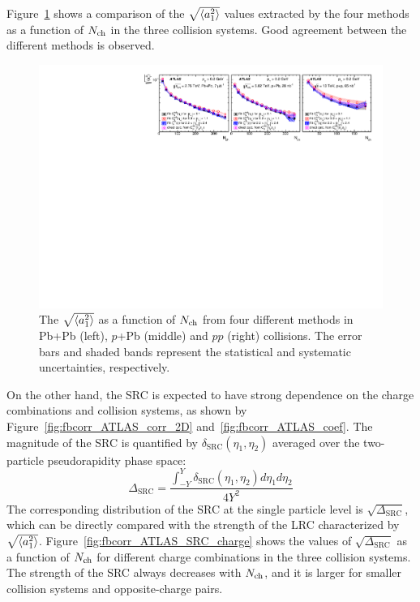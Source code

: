 Figure~\ref{fig:fbcorr_ATLAS_a1_methodComp} shows a comparison of the $\sqrt{\left\langle a_1^2\right\rangle}$ values extracted by the four methods as a function of $N_\text{ch}$ in the three collision systems. Good agreement between the different methods is observed.

\begin{figure}[H]
\centering
\includegraphics[width=.95\linewidth]{figs/chapter_fbcorr/ATLAS_a1_methodComp.pdf}
\caption{The $\sqrt{\left\langle a_1^2\right\rangle}$ as a function of $N_\text{ch}$ from four different methods in Pb+Pb (left), $p$+Pb (middle) and $pp$ (right) collisions. The error bars and shaded bands represent the statistical and systematic uncertainties, respectively.}
\label{fig:fbcorr_ATLAS_a1_methodComp}
\end{figure}

On the other hand, the SRC is expected to have strong dependence on the charge combinations and collision systems, as shown by Figure~\ref{fig:fbcorr_ATLAS_corr_2D} and~\ref{fig:fbcorr_ATLAS_coef}. The magnitude of the SRC is quantified by $\delta_\text{SRC}(\eta_1, \eta_2)$ averaged over the two-particle pseudorapidity phase space:
\begin{equation}
\Delta_\text{SRC} = \frac{\int_{-Y}^Y \delta_\text{SRC}(\eta_1, \eta_2) d\eta_1 d\eta_2}{4Y^2}
\end{equation}
The corresponding distribution of the SRC at the single particle level is $\sqrt{\Delta_\text{SRC}}$, which can be directly compared with the strength of the LRC characterized by $\sqrt{\left\langle a_1^2\right\rangle}$. Figure~\ref{fig:fbcorr_ATLAS_SRC_charge} shows the values of $\sqrt{\Delta_\text{SRC}}$ as a function of $N_\text{ch}$ for different charge combinations in the three collision systems. The strength of the SRC always decreases with $N_\text{ch}$, and it is larger for smaller collision systems and opposite-charge pairs.

